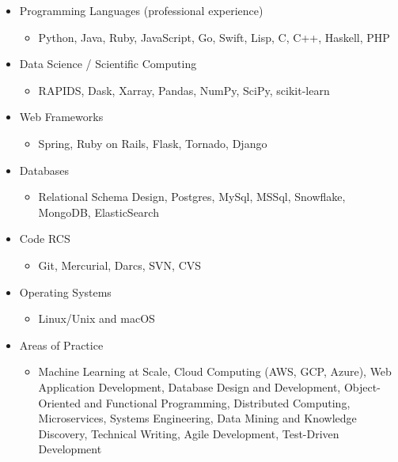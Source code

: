 \begin{itemize}
\tightlist
\item
  Programming Languages (professional experience)

  \begin{itemize}
  \tightlist
  \item
    Python, Java, Ruby, JavaScript, Go, Swift, Lisp, C, C++, Haskell,
    PHP
  \end{itemize}
\item
  Data Science / Scientific Computing

  \begin{itemize}
  \tightlist
  \item
    RAPIDS, Dask, Xarray, Pandas, NumPy, SciPy, scikit-learn
  \end{itemize}
\item
  Web Frameworks

  \begin{itemize}
  \tightlist
  \item
    Spring, Ruby on Rails, Flask, Tornado, Django
  \end{itemize}
\item
  Databases

  \begin{itemize}
  \tightlist
  \item
    Relational Schema Design, Postgres, MySql, MSSql, Snowflake,
    MongoDB, ElasticSearch
  \end{itemize}
\item
  Code RCS

  \begin{itemize}
  \tightlist
  \item
    Git, Mercurial, Darcs, SVN, CVS
  \end{itemize}
\item
  Operating Systems

  \begin{itemize}
  \tightlist
  \item
    Linux/Unix and macOS
  \end{itemize}
\item
  Areas of Practice

  \begin{itemize}
  \tightlist
  \item
    Machine Learning at Scale, Cloud Computing (AWS, GCP, Azure), Web
    Application Development, Database Design and Development,
    Object-Oriented and Functional Programming, Distributed Computing,
    Microservices, Systems Engineering, Data Mining and Knowledge
    Discovery, Technical Writing, Agile Development, Test-Driven
    Development
  \end{itemize}
\end{itemize}
